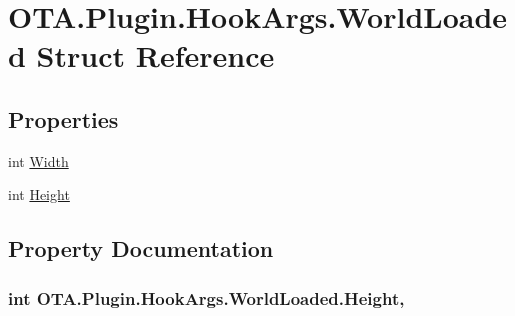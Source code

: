 \hypertarget{struct_o_t_a_1_1_plugin_1_1_hook_args_1_1_world_loaded}{}\section{O\+T\+A.\+Plugin.\+Hook\+Args.\+World\+Loaded Struct Reference}
\label{struct_o_t_a_1_1_plugin_1_1_hook_args_1_1_world_loaded}
\subsection*{Properties}
\begin{DoxyCompactItemize}
\item 
int \hyperlink{struct_o_t_a_1_1_plugin_1_1_hook_args_1_1_world_loaded_ade0f32d7e15bf115ac241277d69b4e4a}{Width}
\item 
int \hyperlink{struct_o_t_a_1_1_plugin_1_1_hook_args_1_1_world_loaded_a480b779c62fd8c27eece138b59f4875e}{Height}
\end{DoxyCompactItemize}


\subsection{Property Documentation}
\hypertarget{struct_o_t_a_1_1_plugin_1_1_hook_args_1_1_world_loaded_a480b779c62fd8c27eece138b59f4875e}{}
\subsubsection[{Height}]{\setlength{\rightskip}{0pt plus 5cm}int O\+T\+A.\+Plugin.\+Hook\+Args.\+World\+Loaded.\+Height\hspace{0.3cm}{\ttfamily [get]}, {\ttfamily [set]}}\label{struct_o_t_a_1_1_plugin_1_1_hook_args_1_1_world_loaded_a480b779c62fd8c27eece138b59f4875e}
\hypertarget{struct_o_t_a_1_1_plugin_1_1_hook_args_1_1_world_loaded_ade0f32d7e15bf115ac241277d69b4e4a}{}
